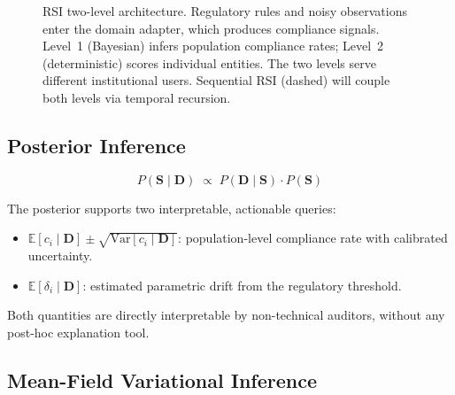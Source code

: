 \documentclass[letterpaper]{article}
\begin{document}
\begin{figure}[H]
\caption{RSI two-level architecture. Regulatory rules and noisy
         observations enter the domain adapter, which produces
         compliance signals. Level~1 (Bayesian) infers population
         compliance rates; Level~2 (deterministic) scores individual
         entities. The two levels serve different institutional users.
         Sequential RSI (dashed) will couple both levels via temporal
         recursion.}
\label{fig:architecture}
\end{figure}

\subsection{Posterior Inference}

\[
  \boxed{P(\mathbf{S} \mid \mathbf{D}) \;\propto\;
    P(\mathbf{D} \mid \mathbf{S}) \cdot P(\mathbf{S})}
\]

The posterior supports two interpretable, actionable queries:
\begin{itemize}[leftmargin=1.5em]
  \item $\mathbb{E}[c_i \mid \mathbf{D}] \pm \sqrt{\mathrm{Var}[c_i \mid \mathbf{D}]}$:
        population-level compliance rate with calibrated uncertainty.
  \item $\mathbb{E}[\delta_i \mid \mathbf{D}]$: estimated parametric
        drift from the regulatory threshold.
\end{itemize}
Both quantities are directly interpretable by non-technical auditors,
without any post-hoc explanation tool.

\subsection{Mean-Field Variational Inference}
\label{sec:mfvi}
\end{document}
